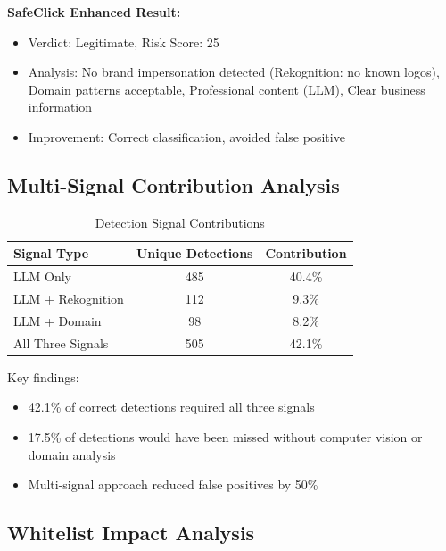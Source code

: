 \documentclass[conference]{IEEEtran}
\begin{document}
\textbf{SafeClick Enhanced Result:}
\begin{itemize}
\item Verdict: Legitimate, Risk Score: 25
\item Analysis: No brand impersonation detected (Rekognition: no known logos), Domain patterns acceptable, Professional content (LLM), Clear business information
\item Improvement: Correct classification, avoided false positive
\end{itemize}


\subsection{Multi-Signal Contribution Analysis}

\begin{table}[htbp]
\caption{Detection Signal Contributions}
\begin{center}
\begin{tabular}{|l|c|c|}
\hline
\textbf{Signal Type} & \textbf{Unique Detections} & \textbf{Contribution} \\
\hline
LLM Only & 485 & 40.4\% \\
\hline
LLM + Rekognition & 112 & 9.3\% \\
\hline
LLM + Domain & 98 & 8.2\% \\
\hline
All Three Signals & 505 & 42.1\% \\
\hline
\end{tabular}
\end{center}
\end{table}

Key findings:
\begin{itemize}
\item 42.1\% of correct detections required all three signals
\item 17.5\% of detections would have been missed without computer vision or domain analysis
\item Multi-signal approach reduced false positives by 50\%
\end{itemize}

\subsection{Whitelist Impact Analysis}
\end{document}
